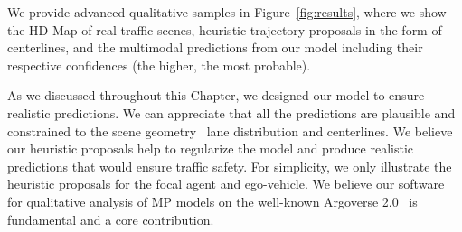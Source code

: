 We provide advanced qualitative samples in Figure~\ref{fig:results}, where we show the HD Map of real traffic scenes, heuristic trajectory proposals in the form of centerlines, and the multimodal predictions from our model including their respective confidences (the higher, the most probable). 

As we discussed throughout this Chapter, we designed our model to ensure realistic predictions. We can appreciate that all the predictions are plausible and constrained to the scene geometry \eg \ lane distribution and centerlines. We believe our heuristic proposals help to regularize the model and produce realistic predictions that would ensure traffic safety. For simplicity, we only illustrate the heuristic proposals for the focal agent and ego-vehicle. We believe our software for qualitative analysis of MP models on the well-known Argoverse 2.0~\cite{wilson2023argoverse} is fundamental and a core contribution.

